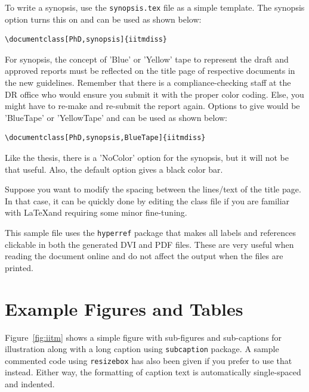 To write a synopsis, use the \verb+synopsis.tex+ file as a simple template. The synopsis option turns this on and can be used as shown below:
\begin{verbatim}
\documentclass[PhD,synopsis]{iitmdiss}                                
\end{verbatim}

For synopsis, the concept of 'Blue' or 'Yellow' tape to represent the draft and approved reports must be reflected on the title page of respective documents in the new guidelines. Remember that there is a compliance-checking staff at the DR office who would ensure you submit it with the proper color coding. Else, you might have to re-make and re-submit the report again. Options to give would be 'BlueTape' or 'YellowTape' and can be used as shown below:
\begin{verbatim}
\documentclass[PhD,synopsis,BlueTape]{iitmdiss}                                
\end{verbatim}

Like the thesis, there is a 'NoColor' option for the synopsis, but it will not be that useful. Also, the default option gives a black color bar.

Suppose you want to modify the spacing between the lines/text of the title page. In that case, it can be quickly done by editing the class file if you are familiar with \LaTeX and requiring some minor fine-tuning.


This sample file uses the \verb+hyperref+ package that makes all labels and references clickable in both the generated DVI and PDF files.  These are very useful when reading the document online and do not affect the output when the files are printed.

\section{Example Figures and Tables}

Figure~\ref{fig:iitm} shows a simple figure with sub-figures and sub-captions for illustration along with a long caption using \verb+subcaption+ package.  A sample commented code using \verb|resizebox| has also been given if you prefer to use that instead. Either way, the formatting of caption text is automatically single-spaced and indented.


